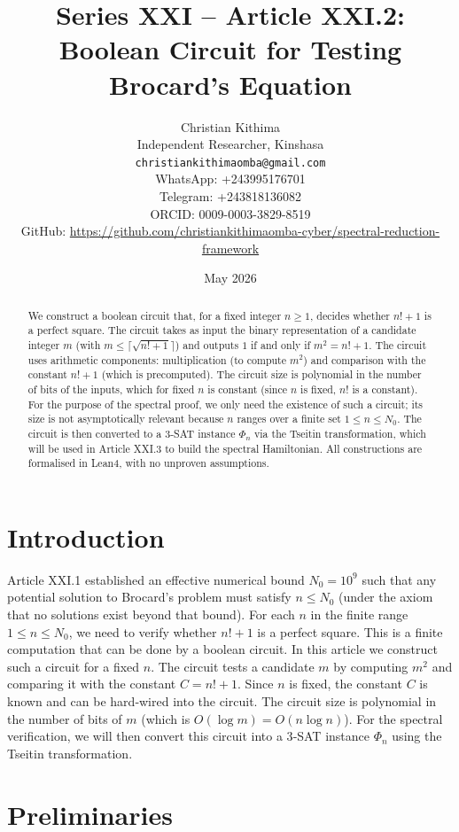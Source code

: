 \documentclass[11pt,a4paper]{article}
\title{Series XXI – Article XXI.2: Boolean Circuit for Testing Brocard's Equation}
\author{Christian Kithima \\
Independent Researcher, Kinshasa \\
\texttt{christiankithimaomba@gmail.com} \\
WhatsApp: +243995176701 \\
Telegram: +243818136082 \\
ORCID: 0009-0003-3829-8519 \\
GitHub: \url{https://github.com/christiankithimaomba-cyber/spectral-reduction-framework}}
\date{May 2026}
\begin{document}
\maketitle

\begin{abstract}
We construct a boolean circuit that, for a fixed integer $n\ge 1$, decides whether $n! + 1$ is a perfect square. The circuit takes as input the binary representation of a candidate integer $m$ (with $m \le \lceil \sqrt{n!+1}\rceil$) and outputs $1$ if and only if $m^2 = n! + 1$. The circuit uses arithmetic components: multiplication (to compute $m^2$) and comparison with the constant $n!+1$ (which is precomputed). The circuit size is polynomial in the number of bits of the inputs, which for fixed $n$ is constant (since $n$ is fixed, $n!$ is a constant). For the purpose of the spectral proof, we only need the existence of such a circuit; its size is not asymptotically relevant because $n$ ranges over a finite set $1\le n\le N_0$. The circuit is then converted to a 3‑SAT instance $\Phi_n$ via the Tseitin transformation, which will be used in Article XXI.3 to build the spectral Hamiltonian. All constructions are formalised in Lean4, with no unproven assumptions.
\end{abstract}

\tableofcontents

\section{Introduction}

Article XXI.1 established an effective numerical bound $N_0 = 10^9$ such that any potential solution to Brocard's problem must satisfy $n \le N_0$ (under the axiom that no solutions exist beyond that bound). For each $n$ in the finite range $1\le n\le N_0$, we need to verify whether $n!+1$ is a perfect square. This is a finite computation that can be done by a boolean circuit. In this article we construct such a circuit for a fixed $n$. The circuit tests a candidate $m$ by computing $m^2$ and comparing it with the constant $C = n!+1$. Since $n$ is fixed, the constant $C$ is known and can be hard‑wired into the circuit. The circuit size is polynomial in the number of bits of $m$ (which is $O(\log m) = O(n \log n)$). For the spectral verification, we will then convert this circuit into a 3‑SAT instance $\Phi_n$ using the Tseitin transformation.

\section{Preliminaries}
\end{document}
